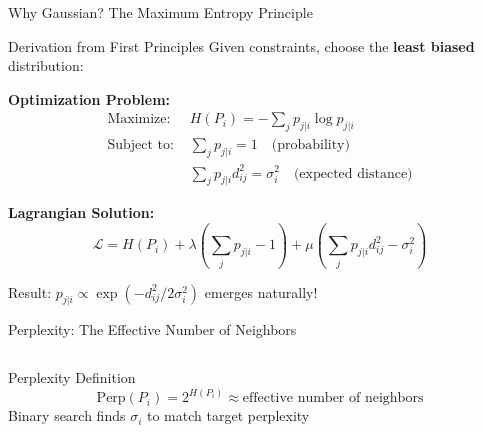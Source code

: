 \begin{frame}{Why Gaussian? The Maximum Entropy Principle}
\begin{block}{Derivation from First Principles}
Given constraints, choose the \textbf{least biased} distribution:
  \end{block}

\textbf{Optimization Problem:}
\begin{align*}
\text{Maximize: } & H(P_i) = -\sum_j p_{j|i} \log p_{j|i} \\
\text{Subject to: } & \sum_j p_{j|i} = 1 \quad \text{(probability)} \\
& \sum_j p_{j|i} d_{ij}^2 = \sigma_i^2 \quad \text{(expected distance)}
\end{align*}

\textbf{Lagrangian Solution:}
$$\mathcal{L} = H(P_i) + \lambda\left(\sum_j p_{j|i} - 1\right) + \mu\left(\sum_j p_{j|i}d_{ij}^2 - \sigma_i^2\right)$$
  
  \begin{center}
\colorbox{yellow!30}{\parbox{\textwidth}{Result: $p_{j|i} \propto \exp(-d_{ij}^2/2\sigma_i^2)$ emerges naturally!}}
\end{center}
\end{frame}

\begin{frame}{Perplexity: The Effective Number of Neighbors}
\begin{columns}
\begin{center}
\end{center}

\begin{center}
\end{center}
\end{columns}

\vspace{0.5cm}
\begin{block}{Perplexity Definition}
$$\text{Perp}(P_i) = 2^{H(P_i)} \approx \text{effective number of neighbors}$$
  Binary search finds $\sigma_i$ to match target perplexity
\end{block}
\end{frame}

